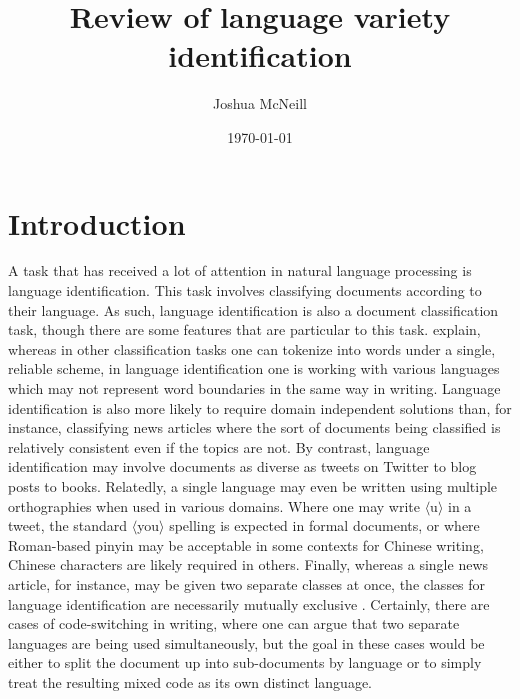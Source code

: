 \documentclass{article}
\title{Review of language variety identification}
\author{Joshua McNeill}
\date{\today}
\newcommand{\orth}[1]{$\langle$#1$\rangle$}
\begin{document}
  \section{Introduction}
    A task that has received a lot of attention in natural language processing is language identification.
    This task involves classifying documents according to their language.
    As such, language identification is also a document classification task, though there are some features that are particular to this task.
    \textcite{jauhiainen_automatic_2019} explain, whereas in other classification tasks one can tokenize into words under a single, reliable scheme, in language identification one is working with various languages which may not represent word boundaries in the same way in writing.
    Language identification is also more likely to require domain independent solutions than, for instance, classifying news articles where the sort of documents being classified is relatively consistent even if the topics are not.
    By contrast, language identification may involve documents as diverse as tweets on Twitter to blog posts to books.
    Relatedly, a single language may even be written using multiple orthographies when used in various domains.
    Where one may write \orth{u} in a tweet, the standard \orth{you} spelling is expected in formal documents, or where Roman-based pinyin may be acceptable in some contexts for Chinese writing, Chinese characters are likely required in others.
    Finally, whereas a single news article, for instance, may be given two separate classes at once, the classes for language identification are necessarily mutually exclusive \parencite[p.~678]{jauhiainen_automatic_2019}.
    Certainly, there are cases of code-switching in writing, where one can argue that two separate languages are being used simultaneously, but the goal in these cases would be either to split the document up into sub-documents by language or to simply treat the resulting mixed code as its own distinct language.
\end{document}
